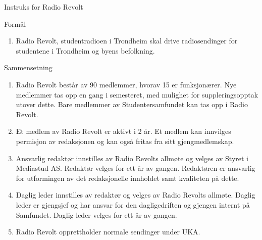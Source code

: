 \documentclass[../fsbok.tex]{subfiles}
\begin{document}
\begin{instruks*}{Instruks for Radio Revolt}

    \begin{instruksledd}{Formål}
        \begin{enumerate}
            \item Radio Revolt, studentradioen i Trondheim skal drive radiosendinger for studentene
                i Trondheim og byens befolkning.
        \end{enumerate}
    \end{instruksledd}

    \begin{instruksledd}{Sammensetning}
        \begin{enumerate}
            \item Radio Revolt består av 90 medlemmer, hvorav 15 er funksjonærer. Nye medlemmer tas
                opp en gang i semesteret, med mulighet for suppleringsopptak utover dette. Bare medlemmer av
                Studentersamfundet kan tas opp i Radio Revolt.
            \item Et medlem av Radio Revolt er aktivt i 2 år. Et medlem kan innvilges permisjon av
                redaksjonen og kan også fritas fra sitt gjengmedlemskap.
            \item Ansvarlig redaktør innstilles av Radio Revolts allmøte og velges av Styret i
                Mediastud AS. Redaktør velges for ett år av gangen. Redaktøren er ansvarlig for utformingen av det
                redaksjonelle innholdet samt kvaliteten på dette.
            \item Daglig leder innstilles av redaktør og velges av Radio Revolts allmøte.
                Daglig leder er gjengsjef og har ansvar for den dagligedriften og gjengen internt på Samfundet.
                Daglig leder velges for ett år av gangen.
            \item Radio Revolt opprettholder normale sendinger under UKA.
        \end{enumerate}
    \end{instruksledd}
    

\end{instruks*}
\end{document}
